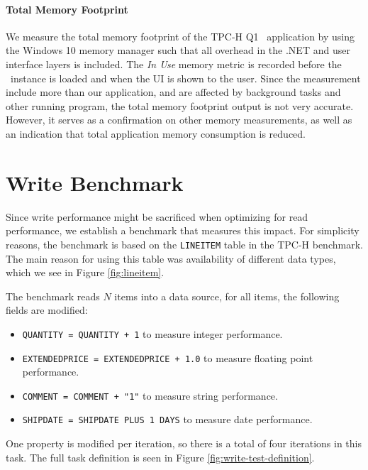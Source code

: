 \paragraph{Total Memory Footprint}
\label{par:Total Memory Footprint}
We measure the total memory footprint of the TPC-H Q1 \gd~application by using the Windows 10 memory manager such that all overhead in the .NET and user interface layers is included. The \textit{In Use} memory metric is recorded before the \gd~instance is loaded and when the UI is shown to the user. Since the measurement include more than our application, and are affected by background tasks and other running program, the total memory footprint output is not very accurate. However, it serves as a confirmation on other memory measurements, as well as an indication that total application memory consumption is reduced.

\section{Write Benchmark}
\label{bm:write}
Since write performance might be sacrificed when optimizing for read performance, we establish a benchmark that measures this impact. For simplicity reasons, the benchmark is based on the \texttt{LINEITEM} table in the TPC-H benchmark. The main reason for using this table was availability of  different data types, which we see in Figure \ref{fig:lineitem}.

The benchmark reads $N$ items into a data source, for all items, the following fields are modified:
\begin{itemize}
    \item \texttt{QUANTITY = QUANTITY + 1} to measure integer performance.
    \item \texttt{EXTENDEDPRICE = EXTENDEDPRICE + 1.0} to measure floating point performance.
    \item \texttt{COMMENT = COMMENT + "1"} to measure string performance.
    \item \texttt{SHIPDATE = SHIPDATE PLUS 1 DAYS} to measure date performance.
\end{itemize}
One property is modified per iteration, so there is a total of four iterations in this task. The full task definition is seen in Figure \ref{fig:write-test-definition}.

